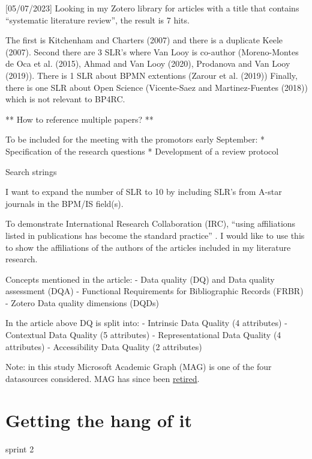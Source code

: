 \documentclass[
  letterpaper,
  DIV=11,
  numbers=noendperiod]{scrreprt}
\begin{document}
{[}05/07/2023{]} Looking in my Zotero library for articles with a title
that contains ``systematic literature review'', the result is 7 hits.

The first is Kitchenham and Charters (2007) and there is a duplicate
Keele (2007). Second there are 3 SLR's where Van Looy is co-author
(Moreno-Montes de Oca et al. (2015), Ahmad and Van Looy (2020),
Prodanova and Van Looy (2019)). There is 1 SLR about BPMN extentions
(Zarour et al. (2019)) Finally, there is one SLR about Open Science
(Vicente-Saez and Martinez-Fuentes (2018)) which is not relevant to
BP4RC.

** How to reference multiple papers? **

To be included for the meeting with the promotors early September: *
Specification of the research questions * Development of a review
protocol

Search strings

I want to expand the number of SLR to 10 by including SLR's from A-star
journals in the BPM/IS field(s).

To demonstrate International Research Collaboration (IRC), ``using
affiliations listed in publications has become the standard practice''
\href{https://direct.mit.edu/qss/article/3/3/529/112967/Assessing-the-quality-of-bibliographic-data}{}.
I would like to use this to show the affiliations of the authors of the
articles included in my literature research.

Concepts mentioned in the article: - Data quality (DQ) and Data quality
assessment (DQA) - Functional Requirements for Bibliographic Records
(FRBR) - Zotero Data quality dimensions (DQDs)

In the article above DQ is split into: - Intrinsic Data Quality (4
attributes) - Contextual Data Quality (5 attributes) - Representational
Data Quality (4 attributes) - Accessibility Data Quality (2 attributes)

Note: in this study Microsoft Academic Graph (MAG) is one of the four
datasources considered. MAG has since been
\href{https://www.microsoft.com/en-us/research/project/microsoft-academic-graph/}{retired}.

\hypertarget{getting-the-hang-of-it}{%
\chapter{Getting the hang of it}\label{getting-the-hang-of-it}}

sprint 2

\hfill\break
\end{document}

